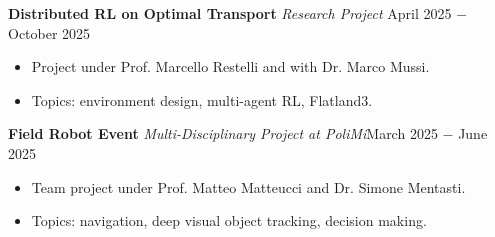 \documentclass{article}
\begin{document}
\noindent \textbf{Distributed RL on Optimal Transport} \textit{Research Project} \href{https://github.com/RobinU434/SwitchFL}{\faGithubSquare} \hfill April 2025 $-$ October 2025
\begin{itemize}[noitemsep,nolistsep,leftmargin=*]
    \item Project under Prof. Marcello Restelli and with Dr. Marco Mussi.
    \item Topics: environment design, multi-agent RL, Flatland3.\\
\end{itemize}

\noindent \textbf{Field Robot Event} \textit{Multi-Disciplinary Project at PoliMi}\hfill March 2025 $-$ June 2025
\begin{itemize}[noitemsep,nolistsep,leftmargin=*]
    \item Team project under Prof. Matteo Matteucci and Dr. Simone Mentasti.
    \item Topics: navigation, deep visual object tracking, decision making.\\
\end{itemize}
\end{document}
